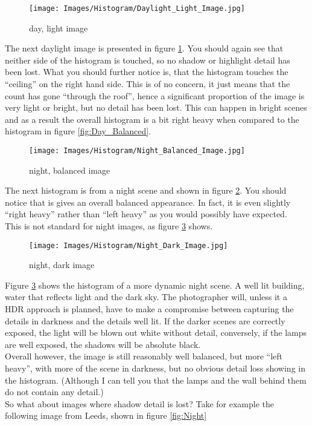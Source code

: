 \begin{figure}
	\centering
		\texttt{[image: Images/Histogram/Daylight\_Light\_Image.jpg]}
	\caption{day, light image}
	\label{fig:Daylight_Light_Image}
\end{figure}

The next daylight image is presented in figure \ref{fig:Daylight_Light_Image}. You should again see that neither side of the histogram is touched, so no shadow or highlight detail has been lost. What you should further notice is, that the histogram touches the ``ceiling'' on the right hand side. This is of no concern, it just means that the count has gone ``through the roof'', hence a significant proportion of the image is very light or bright, but no detail has been lost. This can happen in bright scenes and as a result the overall histogram is a bit right heavy when compared to the histogram in figure \ref{fig:Day_Balanced}.

\begin{figure}
	\centering
		\texttt{[image: Images/Histogram/Night\_Balanced\_Image.jpg]}
	\caption{night, balanced image}
	\label{fig:Night_Balanced_Image}
\end{figure}

The next histogram is from a night scene and shown in figure \ref{fig:Night_Balanced_Image}. You should notice that is gives an overall balanced appearance. In fact, it is even slightly ``right heavy'' rather than ``left heavy'' as you would possibly have expected.
\\
This is not standard for night images, as figure \ref{fig:Night_Dark_Image} shows.

\begin{figure}
	\centering
		\texttt{[image: Images/Histogram/Night\_Dark\_Image.jpg]}
	\caption{night, dark image}
	\label{fig:Night_Dark_Image}
\end{figure}

Figure \ref{fig:Night_Dark_Image} shows the histogram of a more dynamic night scene. A well lit building, water that reflects light and the dark sky. The photographer will, unless it a \gls{HDR} approach is planned, have to make a compromise between capturing the details in darkness and the details well lit. If the darker scenes are correctly exposed, the light will be blown out white without detail, conversely, if the lamps are well exposed, the shadows will be absolute black.
\\
Overall however, the image is still reasonably well balanced, but more ``left heavy'', with more of the scene in darkness, but no obvious detail loss showing in the histogram. (Although I can tell you that the lamps and the wall behind them do not contain any detail.)
\\[\baselineskip]
So what about images where shadow detail is lost? Take for example the following image from Leeds, shown in figure \ref{fig:Night}

